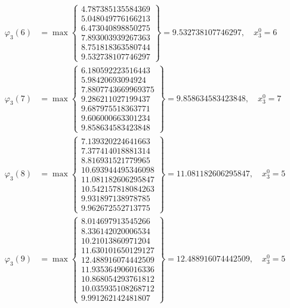 \documentclass{article}
\begin{document}
\begin{align*}
  
\varphi_{3}(6) &= \max \left\{ \begin{array}{c}
4.787385135584369 \\
 5.048049776166213 \\
 6.473040898850275 \\
 7.893003939267363 \\
 8.751818363580744 \\
 9.532738107746297
\end{array} \right\} = 9.532738107746297, \quad x_{3}^0 = 6\\
  
  
  
  
\varphi_{3}(7) &= \max \left\{ \begin{array}{c}
6.180592223516443 \\
 5.98420693094924 \\
 7.8807743669969375 \\
 9.286211027199437 \\
 9.687975518363771 \\
 9.606000663301234 \\
 9.858634583423848
\end{array} \right\} = 9.858634583423848, \quad x_{3}^0 = 7\\
  
  
  
  
\varphi_{3}(8) &= \max \left\{ \begin{array}{c}
7.139320224641663 \\
 7.377414018881314 \\
 8.816931521779965 \\
 10.693944495346098 \\
 11.081182606295847 \\
 10.542157818084263 \\
 9.931897138978785 \\
 9.962672552713775
\end{array} \right\} = 11.081182606295847, \quad x_{3}^0 = 5\\
  
  
  
  
\varphi_{3}(9) &= \max \left\{ \begin{array}{c}
8.014697913545266 \\
 8.336142020006534 \\
 10.21013860971204 \\
 11.630101650129127 \\
 12.488916074442509 \\
 11.935364906016336 \\
 10.868054293761812 \\
 10.035935108268712 \\
 9.991262142481807
\end{array} \right\} = 12.488916074442509, \quad x_{3}^0 = 5\\
  

\end{align*}
\end{document}
